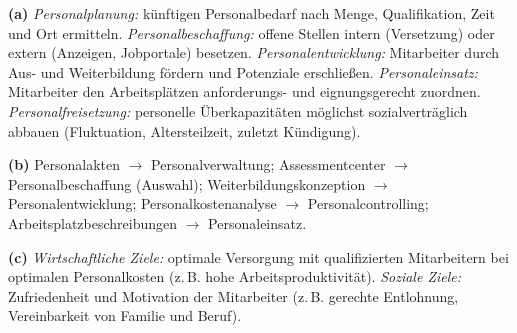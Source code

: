 \documentclass[11pt, a4paper]{article}
\begin{document}
\begin{loesung}[title={Lösung Aufgabe~8 --- Personalwirtschaft}]
\textbf{(a)} \emph{Personalplanung:} künftigen Personalbedarf nach Menge, Qualifikation,
Zeit und Ort ermitteln. \emph{Personalbeschaffung:} offene Stellen intern (Versetzung)
oder extern (Anzeigen, Jobportale) besetzen. \emph{Personalentwicklung:} Mitarbeiter durch
Aus- und Weiterbildung fördern und Potenziale erschließen. \emph{Personaleinsatz:}
Mitarbeiter den Arbeitsplätzen anforderungs- und eignungsgerecht zuordnen.
\emph{Personalfreisetzung:} personelle Überkapazitäten möglichst sozialverträglich
abbauen (Fluktuation, Altersteilzeit, zuletzt Kündigung).

\textbf{(b)} Personalakten $\rightarrow$ Personalverwaltung; Assessmentcenter
$\rightarrow$ Personalbeschaffung (Auswahl); Weiterbildungskonzeption $\rightarrow$
Personalentwicklung; Personalkostenanalyse $\rightarrow$ Personalcontrolling;
Arbeitsplatzbeschreibungen $\rightarrow$ Personaleinsatz.

\textbf{(c)} \emph{Wirtschaftliche Ziele:} optimale Versorgung mit qualifizierten
Mitarbeitern bei optimalen Personalkosten (z.\,B. hohe Arbeitsproduktivität).
\emph{Soziale Ziele:} Zufriedenheit und Motivation der Mitarbeiter (z.\,B. gerechte
Entlohnung, Vereinbarkeit von Familie und Beruf).
\end{loesung}
\end{document}
